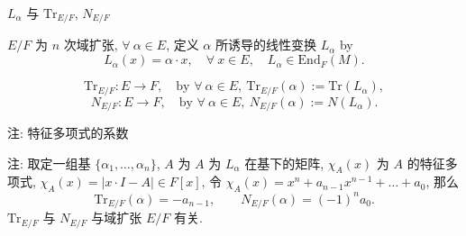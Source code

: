 
\begin{frame}{$L_\alpha$ 与 $\mathrm{Tr}_{E/F}$, $N_{E/F}$}

\begin{Def}[$L_\alpha$]
$E/F$ 为 $n$ 次域扩张, $\forall\ \alpha \in E$, 定义 $\alpha$ 所诱导的线性变换
$L_\alpha$ by
\[
L_\alpha(x) = \alpha \cdot x, \quad \forall\ x \in E, \quad L_\alpha \in \mathrm{End}_F(M).
\]
\end{Def}

\begin{Def}[$\mathrm{Tr}_{E/F}$ 与 $N_{E/F}$]
\[
\mathrm{Tr}_{E/F}: E \to F, \quad \text{by } \forall\ \alpha \in E,\
\mathrm{Tr}_{E/F}(\alpha) := \mathrm{Tr}(L_\alpha),
\]
\[
N_{E/F}: E \to F, \quad \text{by } \forall\ \alpha \in E,\
N_{E/F}(\alpha) := N(L_\alpha).
\]
\end{Def}

\end{frame}


\begin{frame}{注: 特征多项式的系数}

注:  取定一组基 $\{ \alpha_1, \dots, \alpha_n \}$, $A$ 为 $A$ 为 $L_\alpha$
在基下的矩阵, $\chi_A(x)$ 为 $A$ 的特征多项式,
$\chi_A(x) = |x \cdot I - A| \in F[x]$,
令 $\chi_A(x) = x^n + a_{n-1}x^{n-1} + \dots + a_0$,
那么
\[
\mathrm{Tr}_{E/F}(\alpha) = -a_{n-1}, \qquad N_{E/F}(\alpha) = (-1)^n a_0.
\]
\circled{2} $\mathrm{Tr}_{E/F}$ 与 $N_{E/F}$ 与域扩张 $E/F$ 有关.

\end{frame}


